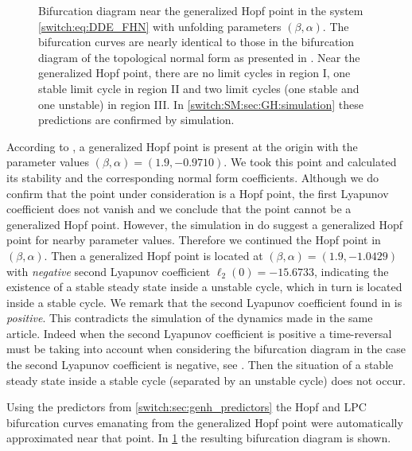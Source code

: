 \begin{figure}[htbp]
\centering
{}
\caption{Bifurcation diagram near the generalized Hopf point in the system
  \cref{switch:eq:DDE_FHN} with unfolding parameters $(\beta,\alpha)$. The bifurcation
  curves are nearly identical to those in the bifurcation diagram of the
  topological normal form as presented in \textup{\cite[page
314]{Kuznetsov2004}}. Near the generalized Hopf point, there are no limit cycles
in region {I}, one stable limit cycle in region {II} and two limit cycles (one
stable and one unstable) in region {III}. In \cref{switch:SM:sec:GH:simulation} these
predictions are confirmed by simulation.}
\label{switch:fig:FHN-bifurcation-diagram}
\end{figure}

According to \cite{Xu2010}, a generalized Hopf point is present at the origin with the parameter values $(\beta,\alpha)=(1.9,-0.9710)$. We took this point and calculated its stability and the corresponding normal form coefficients. Although we do confirm that the point under consideration is a Hopf point, the first Lyapunov coefficient does not vanish and we conclude that the point cannot be a generalized Hopf point. However, the simulation in \cite{Xu2010} do suggest a generalized Hopf point for nearby parameter values. Therefore we continued the Hopf point in $(\beta,\alpha)$. Then a generalized Hopf point is located at $(\beta,\alpha)=(1.9,-1.0429)$ with \emph{negative} second Lyapunov coefficient $\ell_2(0)=-15.6733$, indicating the existence of a stable steady state inside a unstable cycle, which in turn is located inside a stable cycle. We remark that the second Lyapunov coefficient found in \cite{Xu2010} is \emph{positive}. This contradicts the simulation of the dynamics made in the same article. Indeed when the second Lyapunov coefficient is positive a time-reversal must be taking into account when considering the bifurcation diagram in the case the second Lyapunov coefficient is negative, see \cite{Kuznetsov2004}. Then the situation of a stable steady state inside a stable cycle (separated by an unstable cycle) does not occur.

Using the predictors from \cref{switch:sec:genh_predictors} the Hopf and LPC bifurcation curves emanating from the generalized Hopf point were automatically approximated near that point. In \cref{switch:fig:FHN-bifurcation-diagram} the resulting bifurcation diagram is shown. 

